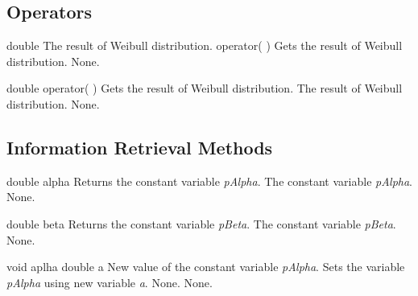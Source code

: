 \clearpage

\subsection{Operators}

\setNormalInstance
\setCorrectWidthThree{8pt}
\printMethodWithParamsSaved
{double}
{The result of Weibull distribution.}
{operator( )}
{Gets the result of Weibull distribution.}
{None.}
\setCorrectWidthThree{4pt}

\setNormalInstance
\printEmptyMethodReturnSpecial
{double}
{operator( )}
{Gets the result of Weibull distribution.}
{The result of Weibull distribution.}
{None.}

\vspace*{10mm}

\subsection{Information Retrieval Methods}

\setConstInstance
\printEmptyMethodReturnSpecial
{double}
{alpha}
{Returns the constant variable {\em pAlpha}.}
{The constant variable {\em pAlpha}.}
{None.}

\setConstInstance
\printEmptyMethodReturnSpecial
{double}
{beta}
{Returns the constant variable {\em pBeta}.}
{The constant variable {\em pBeta}.}
{None.}

\clearpage

\setNormalInstance
\printMethodWithOneParam
{void}
{aplha}
{double}
{a}
{New value of the constant variable {\em pAlpha}.}
{Sets the variable {\em pAlpha} using new variable {\em a}.}
{None.}
{None.}


